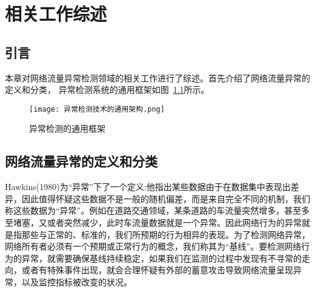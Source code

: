 
\chapter{相关工作综述}

\section{引言}

本章对网络流量异常检测领域的相关工作进行了综述。首先介绍了网络流量异常的定义和分类，
异常检测系统的通用框架如图~\ref{fig:scheme}所示。






\begin{figure}
    \centering
    \texttt{[image: 异常检测技术的通用架构.png]}
    \caption{异常检测的通用框架}
    \label{fig:scheme}
  \end{figure}




\section{网络流量异常的定义和分类}
Hawkins(1980)\cite{hawkins1980identification}为“异常”下了一个定义:他指出某些数据由于在数据集中表现出差异，因此值得怀疑这些数据不是一般的随机偏差，而是来自完全不同的机制，我们称这些数据为“异常”。例如在道路交通领域，某条道路的车流量突然增多，甚至多至堵塞，又或者突然减少，此时车流量数据就是一个异常。因此网络行为的异常就是指那些与正常的、标准的，我们所预期的行为相异的表现。为了检测网络异常，网络所有者必须有一个预期或正常行为的概念，我们称其为“基线”。要检测网络行为的异常，就需要确保基线持续稳定，如果我们在监测的过程中发现有不寻常的走向，或者有特殊事件出现，就会合理怀疑有外部的蓄意攻击导致网络流量呈现异常，以及监控指标被改变的状况。

